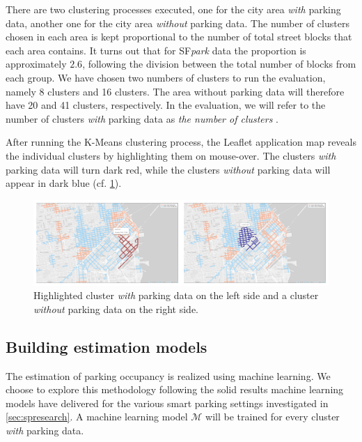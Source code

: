 	There are two clustering processes executed, one for the city area \textit{with} parking data, another one for the city area \textit{without} parking data. The number of clusters chosen in each area is kept proportional to the number of total street blocks that each area contains. It turns out that for SF\textit{park} data the proportion is approximately $2.6$, following the division between the total number of blocks from each group. We have chosen two numbers of clusters to run the evaluation, namely 8 clusters and 16 clusters. The area without parking data will therefore have 20 and 41 clusters, respectively. In the evaluation, we will refer to the number of clusters \textit{with} parking data as \textit{the number of clusters} .	
	
	After running the K-Means clustering process, the Leaflet application map reveals the individual clusters by highlighting them on mouse-over. The clusters \textit{with} parking data will turn dark red, while the clusters \textit{without} parking data will appear in dark blue (cf. \cref{fig:highlighted_collage}). 
	
	\begin{figure}[!ht]
		\centering
		\includegraphics[width=\textwidth]{graphics/highlighted_collage.png}
		\caption{Highlighted cluster \textit{with} parking data on the left side and a cluster \textit{without} parking data on the right side.}
		\label{fig:highlighted_collage}
	\end{figure}
	
	\subsection{Building estimation models}
	The estimation of parking occupancy is realized using machine learning. We choose to explore this methodology following the solid results machine learning models have delivered for the various smart parking settings investigated in \cref{sec:spresearch}. A machine learning model $\mathcal{M}$ will be trained for every cluster \textit{with} parking data.
	
